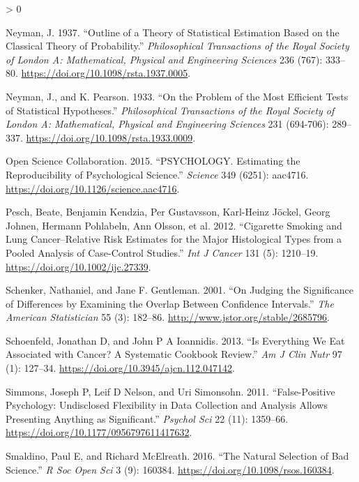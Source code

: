 \documentclass[
  12pt,
]{book}
\newlength{\cslhangindent}
\newenvironment{CSLReferences}[2] %
 {%
  \setlength{\parindent}{0pt}
  \ifodd #1 \everypar{\setlength{\hangindent}{\cslhangindent}}\ignorespaces\fi
  \ifnum #2 > 0
  \setlength{\parskip}{#2\baselineskip}
  \fi
 }%
 {}
\begin{document}
\begin{CSLReferences}{1}{0}
\leavevmode\hypertarget{ref-Neyman37}{}%
Neyman, J. 1937. {``Outline of a Theory of Statistical Estimation Based on the Classical Theory of Probability.''} \emph{Philosophical Transactions of the Royal Society of London A: Mathematical, Physical and Engineering Sciences} 236 (767): 333--80. \url{https://doi.org/10.1098/rsta.1937.0005}.

\leavevmode\hypertarget{ref-Neyman289}{}%
Neyman, J., and K. Pearson. 1933. {``On the Problem of the Most Efficient Tests of Statistical Hypotheses.''} \emph{Philosophical Transactions of the Royal Society of London A: Mathematical, Physical and Engineering Sciences} 231 (694-706): 289--337. \url{https://doi.org/10.1098/rsta.1933.0009}.

\leavevmode\hypertarget{ref-open:2015}{}%
Open Science Collaboration. 2015. {``PSYCHOLOGY. Estimating the Reproducibility of Psychological Science.''} \emph{Science} 349 (6251): aac4716. \url{https://doi.org/10.1126/science.aac4716}.

\leavevmode\hypertarget{ref-pesc:kend:gust:2012}{}%
Pesch, Beate, Benjamin Kendzia, Per Gustavsson, Karl-Heinz Jöckel, Georg Johnen, Hermann Pohlabeln, Ann Olsson, et al. 2012. {``Cigarette Smoking and Lung Cancer--Relative Risk Estimates for the Major Histological Types from a Pooled Analysis of Case-Control Studies.''} \emph{Int J Cancer} 131 (5): 1210--19. \url{https://doi.org/10.1002/ijc.27339}.

\leavevmode\hypertarget{ref-sche:gent:2001}{}%
Schenker, Nathaniel, and Jane F. Gentleman. 2001. {``On Judging the Significance of Differences by Examining the Overlap Between Confidence Intervals.''} \emph{The American Statistician} 55 (3): 182--86. \url{http://www.jstor.org/stable/2685796}.

\leavevmode\hypertarget{ref-scho:ioan:2013}{}%
Schoenfeld, Jonathan D, and John P A Ioannidis. 2013. {``Is Everything We Eat Associated with Cancer? A Systematic Cookbook Review.''} \emph{Am J Clin Nutr} 97 (1): 127--34. \url{https://doi.org/10.3945/ajcn.112.047142}.

\leavevmode\hypertarget{ref-simm:nels:simo:2011}{}%
Simmons, Joseph P, Leif D Nelson, and Uri Simonsohn. 2011. {``False-Positive Psychology: Undisclosed Flexibility in Data Collection and Analysis Allows Presenting Anything as Significant.''} \emph{Psychol Sci} 22 (11): 1359--66. \url{https://doi.org/10.1177/0956797611417632}.

\leavevmode\hypertarget{ref-smal:mcel:2016}{}%
Smaldino, Paul E, and Richard McElreath. 2016. {``The Natural Selection of Bad Science.''} \emph{R Soc Open Sci} 3 (9): 160384. \url{https://doi.org/10.1098/rsos.160384}.


\end{CSLReferences}
\end{document}

